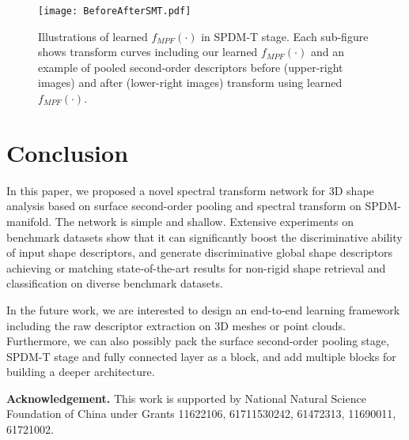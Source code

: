 \documentclass[runningheads]{llncs}
\begin{document}
\begin{figure}
\begin{center}
\texttt{[image: BeforeAfterSMT.pdf]}
\caption{Illustrations of learned $f_{MPF}(\cdot)$ in SPDM-T stage. Each sub-figure shows transform curves including our learned $f_{MPF}(\cdot)$ and an example of pooled second-order descriptors before (upper-right images) and after (lower-right images) transform using learned $f_{MPF}(\cdot)$.} 
\label{fig:BeforeAfterSMT}
\end{center}
\end{figure}


\section{Conclusion}
In this paper, we proposed a novel spectral transform network for 3D shape analysis based on surface second-order pooling and spectral transform on SPDM-manifold. The network is simple and shallow. Extensive experiments on benchmark datasets show that it can significantly boost  the discriminative ability of input shape descriptors, and generate discriminative global shape descriptors achieving or matching state-of-the-art results  for non-rigid shape retrieval and classification on diverse  benchmark datasets.

In the future work, we are interested to design an end-to-end learning framework including the raw descriptor extraction on 3D meshes or point clouds. Furthermore, we can also possibly pack the surface second-order pooling stage, SPDM-T stage and  fully connected layer as a block, and add multiple blocks for building a deeper architecture. 

\noindent
\textbf{Acknowledgement.}
This work is supported by National Natural Science Foundation of China under Grants 11622106, 61711530242, 61472313, 11690011, 61721002.



\end{document}
